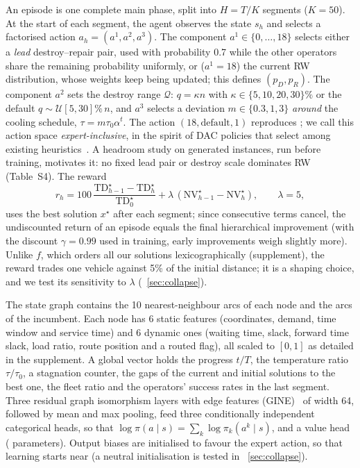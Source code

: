 An episode is one complete main phase, split into $H=T/K$ segments ($K=50$). At the
start of each segment, the agent observes the state $s_h$ and selects a factorised
action $a_h=(a^1,a^2,a^3)$. The component $a^1\in\{0,\dots,18\}$ selects either a
\emph{lead} destroy--repair pair, used with probability 0.7 while the other operators
share the remaining probability uniformly, or ($a^1=18$) the current RW distribution,
whose weights keep being updated; this defines $(p_D,p_R)$. The component $a^2$ sets the
destroy range $\mathcal Q$: $q=\kappa n$ with $\kappa\in\{5,10,20,30\}\%$ or the
default $q\sim\mathcal U[5,30]\%\,n$, and $a^3$
selects a deviation $m\in\{0.3,1,3\}$ \emph{around} the cooling schedule,
$\tau=m\tau_0\alpha^t$. The action $(18,\text{default},1)$ reproduces \Rw{}; we call
this action space \emph{expert-inclusive}, in the spirit of DAC policies that select
among existing heuristics~\cite{speck2021dac}. A headroom study on generated instances,
run before training, motivates it: no fixed lead pair or destroy scale dominates RW
(Table~S4). The reward
\begin{equation}\label{eq:reward}
r_h = 100\,\frac{\mathrm{TD}^\star_{h-1}-\mathrm{TD}^\star_h}{\mathrm{TD}^\star_0}
     +\lambda\,(\mathrm{NV}^\star_{h-1}-\mathrm{NV}^\star_h),\qquad \lambda=5,
\end{equation}
uses the best solution $x^\star$ after each segment; since consecutive terms cancel,
the undiscounted return of an episode equals the final hierarchical improvement (with
the discount $\gamma=0.99$ used in training, early improvements weigh slightly more).
Unlike $f$, which orders all our solutions lexicographically (supplement), the reward
trades one vehicle against 5\% of the initial distance; it is a shaping choice, and we
test its sensitivity to $\lambda$ (\Sect~\ref{sec:collapse}).

The state graph contains the 10 nearest-neighbour arcs of each node and the arcs of the
incumbent. Each node has 6 static features (coordinates, demand, time window and
service time) and 6 dynamic ones (waiting time, slack, forward time slack, load ratio,
route position and a routed flag), all scaled to $[0,1]$ as detailed in the
supplement. A global vector holds the progress $t/T$, the
temperature ratio $\tau/\tau_0$, a stagnation counter, the gaps of the current and
initial solutions to the best one, the fleet ratio and the operators' success rates in
the last segment. Three residual graph isomorphism layers with edge features
(GINE)~\cite{hu2020gine} of width 64, followed by mean and max pooling, feed three
conditionally independent categorical heads, so that $\log\pi(a\mid s)=\sum_k\log
\pi_k(a^k\mid s)$, and a value head (\tParams{} parameters). Output biases are
initialised to favour the expert action, so that learning starts near \Rw{} (a neutral
initialisation is tested in \Sect~\ref{sec:collapse}).


